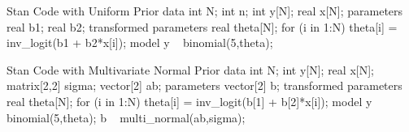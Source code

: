 \documentclass{article}
\begin{document}
\newpage
\begin{sexylisting}{Stan Code with Uniform Prior}
data{
int N;
int n;
int y[N];
real x[N]; 
}
parameters{
real b1; 
real b2; 
}
transformed parameters{
  real theta[N];
  for (i in 1:N)
    theta[i] = inv_logit(b1 + b2*x[i]);
  }
model{
y ~ binomial(5,theta);
}
\end{sexylisting}
\begin{sexylisting}{Stan Code with Multivariate Normal Prior}
data{
int N;
int y[N];
real x[N]; 
matrix[2,2] sigma;
vector[2] ab;
}
parameters{
vector[2] b; 
}
transformed parameters{
  real theta[N];
  for (i in 1:N)
    theta[i] = inv_logit(b[1] + b[2]*x[i]);
}
model{
y ~ binomial(5,theta);
b ~ multi_normal(ab,sigma);
}
\end{sexylisting}


  
\end{document}
